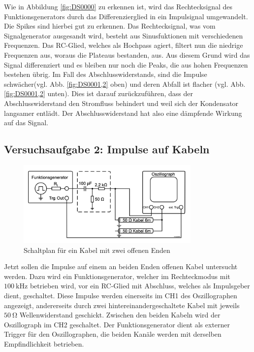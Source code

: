 \documentclass{article}
\begin{document}
            Wie in Abbildung \ref{fig:DS0000} zu erkennen ist, wird das Rechtecksignal des Funktionsgenerators durch das Differenzierglied in ein Impulsignal umgewandelt. Die Spikes sind hierbei gut zu erkennen. Das Rechtecksignal, was vom Signalgenerator ausgesandt wird, besteht aus Sinusfuktionen mit verschiedenen Frequenzen. Das RC-Glied, welches als Hochpass agiert, filtert nun die niedrige Frequenzen aus, woraus die Plateaus bestanden, aus. Aus diesem Grund wird das Signal differenziert und es bleiben nur noch die Peaks, die aus hohen Frequenzen bestehen übrig.
            Im Fall des Abschlusswiderstands, sind die Impulse schwächer(vgl. Abb. \ref{fig:DS0001,2} oben) und deren Abfall ist flacher (vgl. Abb.\ref{fig:DS0001,2} unten).
            Dies ist darauf zurückzuführen, dass der Abschlusswiderstand den Stromfluss behindert und weil sich der Kondensator langsamer entlädt. Der Abschlusswiderstand hat also eine dämpfende Wirkung auf das Signal.
	
\clearpage

\subsection{Versuchsaufgabe 2: Impulse auf Kabeln} 

			
			\begin{figure}[H]
				\centering
				\includegraphics[width=0.8\textwidth]{figs/Aufbau_1_2_Impulse_auf_Kabeln.png}
				\caption{Schaltplan für ein Kabel mit zwei offenen Enden~\cite{anleitung}}
				\label{fig:aufbau_1_1_impulseAufKabeln}
			\end{figure}
			Jetzt sollen die Impulse auf einem an beiden Enden offenen Kabel untersucht werden. Dazu wird ein Funktionsgenerator, welcher im Rechteckmodus mit $\SI{100}{\kilo\hertz}$ betrieben wird, vor ein RC-Glied mit Abschluss, welches als Impulsgeber dient, geschaltet. Diese Impulse werden einerseits im CH1 des Oszillographen angezeigt, andererseits durch zwei hintereinandergeschaltete Kabel mit jeweils $\SI{50}{\ohm}$ Wellenwiderstand geschickt. Zwischen den beiden Kabeln wird der Oszillograph im CH2 geschaltet. Der Funktionsgenerator dient als externer Trigger für den Oszillographen, die beiden Kanäle werden mit derselben Empfindlichkeit betrieben.
			
\end{document}
